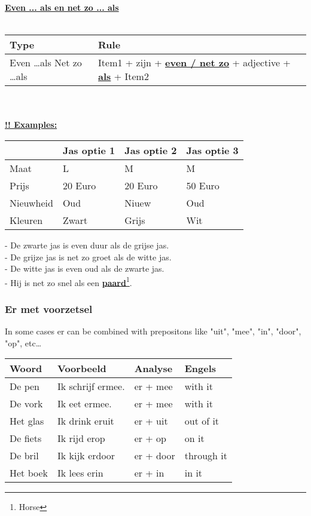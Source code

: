 \documentclass[a4paper,14pt]{extarticle}
\newcommand{\note}[2]{\underline{\textbf{#1}}\footnote{#2}}
\newcommand{\attention}[1]{\underline{\textbf{!! #1}}}
\newcommand{\emp}[1]{\underline{\textbf{#1}}}
\begin{document}
\emp{Even ... als en net zo ... als} \\ \\
\begin{tabularx}{\textwidth}{p{} p{}}
 \hline
\textbf{Type} & \textbf{Rule} \\
 \hline
Even \dots als \newline Net zo \dots als &  Item1 + zijn + \emp{even / net zo} + adjective + \emp{als} + Item2\\
\end{tabularx} \\ \\ 
\attention{Examples:} \\
\begin{center}
\begin{tabularx}{400pt}{p{75pt} p{100pt} p{100pt} p{100pt}}
\hline
& Jas optie 1 & Jas optie 2 & Jas optie 3\\
\hline
Maat & L & M & M \\
Prijs & 20 Euro & 20 Euro & 50 Euro \\
Nieuwheid & Oud & Niuew & Oud \\
Kleuren & Zwart & Grijs & Wit \\
\end{tabularx} 
\end{center}
- De zwarte jas is even duur als de grijse jas. \\
- De grijze jas is net zo groet als de witte jas. \\
- De witte jas is even oud als de zwarte jas. \\
- Hij is net zo snel als een \note{paard}{Horse}.
\subsubsection{Er met voorzetsel}
In some cases er can be combined with prepositons like "uit", "mee", "in", "door", "op", etc\dots \\
\begin{center}
\begin{tabularx}{0.7\textwidth}{p{} p{} p{} p{}}
 \hline
 \textbf{Woord} & \textbf{Voorbeeld} & \textbf{Analyse} & \textbf{Engels}\\
 \hline
 De pen & Ik schrijf ermee. & er + mee & with it \\
 De vork & Ik eet ermee. & er + mee & with it \\
 Het glas & Ik drink eruit & er + uit & out of it \\
 De fiets & Ik rijd erop & er + op & on it \\
 De bril & Ik kijk erdoor & er + door & through it \\
 Het boek & Ik lees erin & er + in & in it \\
\end{tabularx}
\end{center}
\end{document}
